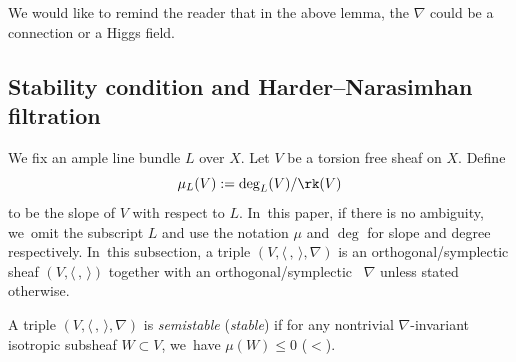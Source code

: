 We would like to remind the reader that in the above lemma, the \lconnection $\nabla$ could be a connection or a Higgs field.

\subsection{Stability condition and Harder--Narasimhan filtration}\label{subsect_stab_cond}
We fix an ample line bundle $L$ over $X$. Let $V$ be a torsion free sheaf on $X$. Define
\[
\mu_L(V):=\deg_L(V)/\rk(V)
\]
to be the slope of $V$ with respect to $L$. In~this paper, if there is no ambiguity, we~omit the subscript $L$ and use the notation $\mu$ and $\deg$ for slope and degree respectively. In~this subsection, a triple $(V,\langle \,, \, \rangle,\nabla)$ is an orthogonal/symplectic sheaf $(V,\langle \,, \, \rangle)$ together with an orthogonal/symplectic \lconnection~$\nabla$ unless stated otherwise.

\begin{defn}\label{defn_stab}
A triple $(V,\langle \,, \, \rangle,\nabla)$ is \emph{semistable} (\resp \emph{stable}) if for any nontrivial $\nabla$-invariant isotropic subsheaf $W \subset V$, we~have $\mu(W)\leqslant 0$ (\resp $<$).
\end{defn}

